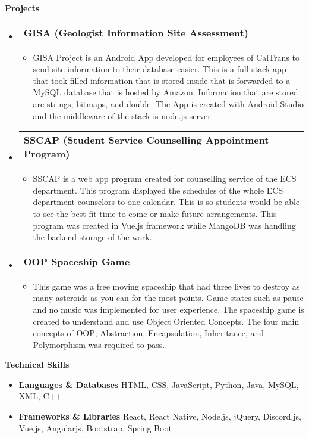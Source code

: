\documentclass[letterpaper,12pt]{article}[leftmargin=*]
\makeatletter
\def \entryspacing {-0pt}
\renewcommand{\section}[2]{\vspace{5pt}
  \colorbox{secondary}{\color{white}\raggedbottom\normalsize\textbf{{#1}{\hspace{7pt}#2}}}
}
\newcommand{\resumeEntryStart}{\begin{itemize}[leftmargin=2.5mm]}
\newcommand{\resumeEntryEnd}{\end{itemize}\vspace{\entryspacing}}
\newcommand{\resumeItemListStart}{\begin{itemize}[leftmargin=4.5mm]}
\newcommand{\resumeItemListEnd}{\end{itemize}}
\newcommand{\resumeItem}[1]{
  \item\small{
    {#1 \vspace{-2pt}}
  }
}
\newcommand{\resumeEntryTD}[2]{
  \vspace{-1pt}\item[]
    \begin{tabularx}{0.97\textwidth}{X@{\hspace{60pt}}r}
      \textbf{\color{primary}#1} & {\firabook\color{accent}\small#2} \\
    \end{tabularx}\vspace{-6pt}
}
\newcommand{\resumeEntryS}[2]{
  \item[]\small{
    \textbf{\color{primary}#1 }{ #2 \vspace{-6pt}}
  }
}
\makeatother
\begin{document}
\section{\faFlask}{Projects}

  \resumeEntryStart
    \resumeEntryTD
      {GISA (Geologist Information Site Assessment)}{}
    \resumeItemListStart
      \resumeItem {GISA Project is an Android App developed for employees of CalTrans to send site information to their database easier. This is a full stack app that took filled information that is stored inside that is forwarded to a MySQL database that is hosted by Amazon. Information that are stored are strings, bitmaps, and double. The App is created with Android Studio and the middleware of the stack is node.js server}
    \resumeItemListEnd
  \resumeEntryEnd

  \resumeEntryStart
    \resumeEntryTD
      {SSCAP (Student Service Counselling Appointment Program)}{}
    \resumeItemListStart
      \resumeItem {SSCAP is a web app program created for counselling service of the ECS department. This program displayed the schedules of the whole ECS department counselors to one calendar. This is so students would be able to see the best fit time to come or make future arrangements. This program was created in Vue.js framework while MangoDB was handling the backend storage of the work. }
    \resumeItemListEnd
  \resumeEntryEnd

  \resumeEntryStart
    \resumeEntryTD
      {OOP Spaceship Game}{}
    \resumeItemListStart
      \resumeItem {This game was a free moving spaceship that had three lives to destroy as many asteroids as you can for the most points. Game states such as pause and no music was implemented for user experience. The spaceship game is created to understand and use Object Oriented Concepts. The four main concepts of OOP; Abstraction, Encapsulation, Inheritance, and Polymorphism was required to pass.}
    \resumeItemListEnd
  \resumeEntryEnd

\section{\faGears}{Technical Skills}
 \resumeEntryStart
  \resumeEntryS{Languages \& Databases } {HTML, CSS, JavaScript, Python, Java, MySQL, XML, C++}
  \resumeEntryS{Frameworks \& Libraries} {React, React Native, Node.js, jQuery, Discord.js, Vue.js, Angularjs, Bootstrap, Spring Boot}
 \resumeEntryEnd
\end{document}
